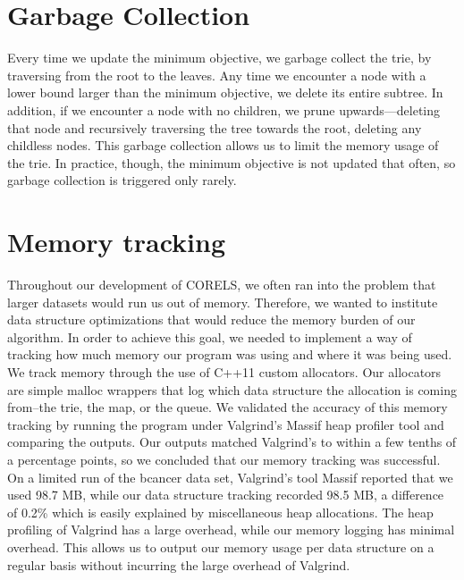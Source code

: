 \section{Garbage Collection}
Every time we update the minimum objective, we garbage collect the trie, by traversing from the root to the leaves.
Any time we encounter a node with a lower bound larger than the minimum objective, we delete its entire subtree.
In addition, if we encounter a node with no children, we prune upwards---deleting that node and recursively traversing the tree towards the root, deleting any childless nodes.
This garbage collection allows us to limit the memory usage of the trie.
In practice, though, the minimum objective is not updated that often, so garbage collection is triggered only rarely.

\section{Memory tracking}
Throughout our development of CORELS, we often ran into the problem that larger datasets would run us out of memory.
Therefore, we wanted to institute data structure optimizations that would reduce the memory burden of our algorithm.
In order to achieve this goal, we needed to implement a way of tracking how much memory our program was using and where it was being used.
We track memory through the use of C++11 custom allocators.
Our allocators are simple malloc wrappers that log which data structure the allocation is coming from--the trie, the map, or the queue.
We validated the accuracy of this memory tracking by running the program under Valgrind's Massif heap profiler tool and comparing the outputs.
Our outputs matched Valgrind's to within a few tenths of a percentage points, so we concluded that our memory tracking was successful.
On a limited run of the bcancer data set, Valgrind's tool Massif reported that we used 98.7 MB, while our data structure tracking recorded 98.5 MB, a difference of 0.2\% which is easily explained by miscellaneous heap allocations.
The heap profiling of Valgrind has a large overhead, while our memory logging has minimal overhead.
This allows us to output our memory usage per data structure on a regular basis without incurring the large overhead of Valgrind.
